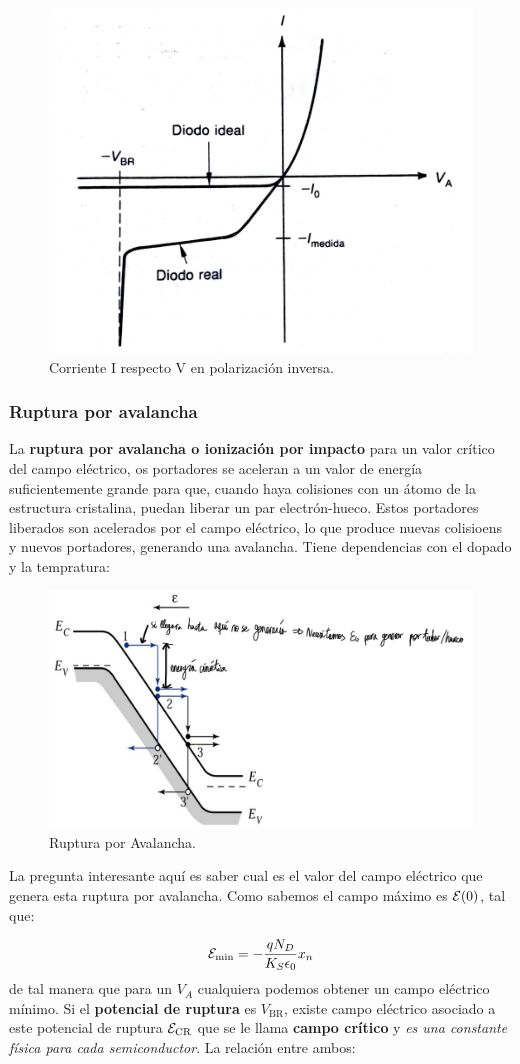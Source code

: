 \begin{figure}[h!] \centering
    \includegraphics[width=0.5\linewidth]{Cuerpo/Ch_03/03_Temario_10.png}
    \caption{Corriente I respecto V en polarización inversa.}
\end{figure}

\subsubsection{Ruptura por avalancha}

La \textbf{ruptura por avalancha o ionización por impacto} para un valor crítico del campo eléctrico, os portadores se aceleran a un valor de energía suficientemente grande para que, cuando haya colisiones con un átomo de la estructura cristalina, puedan liberar un par electrón-hueco. Estos portadores liberados son acelerados por el campo eléctrico, lo que produce nuevas colisioens y nuevos portadores, generando una avalancha. Tiene dependencias con el dopado y la tempratura: 

\begin{figure}[h!] \centering
    \includegraphics[width=0.7\linewidth]{Cuerpo/Ch_03/03_Temario_06.png}
    \caption{Ruptura por Avalancha.}
\end{figure}
La pregunta interesante aquí es saber cual es el valor del campo eléctrico que genera esta ruptura por avalancha. Como sabemos el campo máximo es $\mathcal{E}(0)$, tal que:

\begin{equation}
    \mathcal{E}_{\min} = - \frac{qN_D}{K_S\epsilon_0} x_n 
 \end{equation}
de tal manera que para un $V_A$ cualquiera podemos obtener un campo eléctrico mínimo. Si el \textbf{potencial de ruptura} es $V_{\text{BR}}$, existe campo eléctrico asociado a este potencial de ruptura $\mathcal{E}_{\text{CR}}$  que se le llama \textbf{campo crítico} y \textit{es una constante física para cada semiconductor}. La relación entre ambos: 

